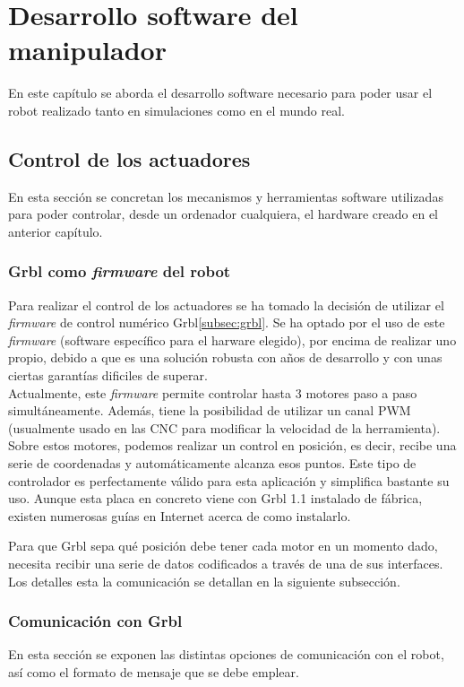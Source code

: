 \chapter{Desarrollo software del manipulador}
\label{cap:capitulo6}

\vspace{1cm}
\noindent En este capítulo se aborda el desarrollo software necesario para poder usar el robot realizado 
tanto en simulaciones como en el mundo real.

\section{Control de los actuadores}
\noindent En esta sección se concretan los mecanismos y herramientas software utilizadas para poder controlar, desde 
un ordenador cualquiera, el hardware creado en el anterior capítulo.

\subsection{Grbl como \textit{firmware} del robot}
\noindent Para realizar el control de los actuadores se ha tomado la decisión de utilizar el \textit{firmware} de control numérico 
Grbl\ref{subsec:grbl}. Se ha optado por el uso de este \textit{firmware} (software específico para el harware elegido), por encima 
de realizar uno propio, debido a que es una solución robusta con años de desarrollo y con unas ciertas garantías dificiles de superar.
\\

Actualmente, este \textit{firmware} permite controlar hasta 3 motores paso a paso simultáneamente. Además, tiene la posibilidad de utilizar 
un canal PWM (usualmente usado en las CNC para modificar la velocidad de la herramienta). Sobre estos motores, podemos realizar 
un control en posición, es decir, recibe una serie de coordenadas y automáticamente alcanza esos puntos. Este tipo de controlador 
es perfectamente válido para esta aplicación y simplifica bastante su uso. Aunque esta placa en concreto viene con Grbl 1.1 instalado 
de fábrica, existen numerosas guías en Internet acerca de como instalarlo.

Para que Grbl sepa qué posición debe tener cada motor en un momento dado, necesita recibir 
una serie de datos codificados a través de una de sus interfaces. Los detalles esta la comunicación 
se detallan en la siguiente subsección.
\newpage
\subsection{Comunicación con Grbl}
\noindent En esta sección se exponen las distintas opciones de comunicación con el robot, así como el formato de mensaje que se debe emplear.
\\ 

